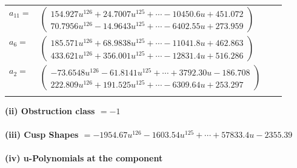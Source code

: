 \documentclass[1p]{elsarticle_modified}
\theoremstyle{definition}
\begin{document}
\begin{tabular}{m{7pt} m{180pt} m{7pt} m{180pt} }
\flushright $a_{11}=$&$\begin{pmatrix}154.927 u^{126}+24.7007 u^{125}+\cdots-10450.6 u+451.072\\70.7956 u^{126}-14.9643 u^{125}+\cdots-6402.55 u+273.959\end{pmatrix}$ \\
\flushright $a_{6}=$&$\begin{pmatrix}185.571 u^{126}+68.9838 u^{125}+\cdots-11041.8 u+462.863\\433.621 u^{126}+356.001 u^{125}+\cdots-12831.4 u+516.286\end{pmatrix}$ \\
\flushright $a_{2}=$&$\begin{pmatrix}-73.6548 u^{126}-61.8141 u^{125}+\cdots+3792.30 u-186.708\\222.809 u^{126}+191.525 u^{125}+\cdots-6309.64 u+253.297\end{pmatrix}$\\&\end{tabular}
\flushleft \textbf{(ii) Obstruction class $= -1$}\\~\\
\flushleft \textbf{(iii) Cusp Shapes $= -1954.67 u^{126}-1603.54 u^{125}+\cdots+57833.4 u-2355.39$}\\~\\
\newpage\renewcommand{\arraystretch}{1}
\flushleft \textbf{(iv) u-Polynomials at the component}\newline \\
\end{document}
